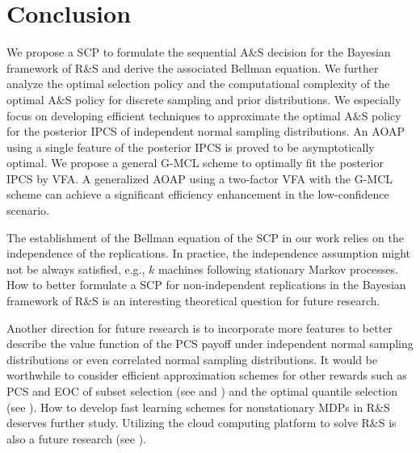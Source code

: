\documentclass[journal]{IEEEtran}
\begin{document}
   \section{Conclusion}\label{cls}
   We propose a SCP to formulate the sequential A\&S decision for the Bayesian framework of R\&S and derive the associated Bellman equation. We further analyze the optimal selection policy and the computational complexity of the optimal A\&S policy for discrete sampling and prior distributions. We especially focus on developing efficient techniques to approximate the optimal A\&S policy for the posterior IPCS of independent normal sampling distributions. An AOAP using a single feature of the posterior IPCS is proved to be asymptotically optimal. We propose a general G-MCL scheme to optimally fit the posterior IPCS by VFA. A generalized AOAP using a two-factor VFA with the G-MCL scheme can achieve a significant efficiency enhancement in the low-confidence scenario.
   
  The establishment of the Bellman equation of the SCP in our work relies on the independence of the replications. In practice, the independence assumption might not be always satisfied, e.g., $k$ machines following stationary Markov processes. How to better formulate a SCP for non-independent replications in the Bayesian framework of R\&S is an interesting theoretical question for  future research.
   
   Another direction for future research is to incorporate more features to better describe the value function of the PCS payoff under independent normal sampling distributions or even correlated normal sampling distributions.
   It would be worthwhile to consider efficient approximation schemes for other rewards such as  PCS and EOC of subset selection (see \cite{chen2008efficient} and \cite{gao2015efficient}) and the optimal quantile selection (see \cite{peng2015bayesian}). How to develop fast learning schemes for nonstationary MDPs in R\&S  deserves further study. Utilizing the cloud computing platform to solve R\&S is also a future research (see \cite{xu2015simulation}).


% 
%
          


\end{document}
